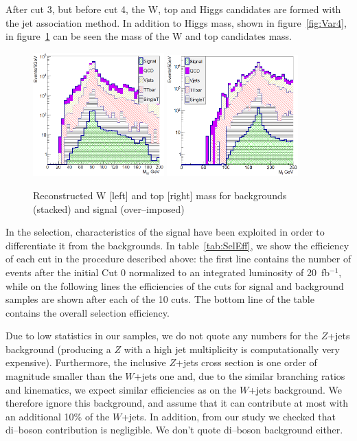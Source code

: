 After cut 3, but before cut 4, the W, top and Higgs candidates are formed with the jet association method. In addition to Higgs mass, shown in figure~\ref{fig:Var4}, in figure~\ref{fig:MWMTop} can be seen the mass of the W and top candidates mass.

\begin{figure}[!Hhtbp]
  \begin{center}
    \includegraphics[width=0.45\textwidth]{figs/Pheno/MW.png}
    \includegraphics[width=0.45\textwidth]{figs/Pheno/Mtop.png}
    \caption{Reconstructed W [left] and top [right] mass for backgrounds (stacked) and signal (over--imposed)}
    \label{fig:MWMTop}
  \end{center}
\end{figure}

In the selection, characteristics of the signal have been exploited in order to differentiate it from the backgrounds. In table~\ref{tab:SelEff}, we show the efficiency of each cut in the procedure described above: the first line contains the number of events after the initial Cut 0 normalized to an integrated luminosity of 20~fb$^{-1}$, while on the following lines the efficiencies of the cuts for signal and background samples are shown after each of the 10 cuts. The bottom line of the table contains the overall selection efficiency. 

Due to low statistics in our samples, we do not quote any numbers for the $Z$+jets background (producing a $Z$ with a high jet multiplicity is computationally very expensive). Furthermore, the inclusive $Z$+jets cross section is one order of magnitude smaller than the $W$+jets one and, due to the similar branching ratios and kinematics, we expect similar efficiencies as on the $W$+jets background. We therefore ignore this background, and assume that it can contribute at most with an additional 10\% of the $W$+jets. In addition, from our study we checked that di--boson contribution is negligible. We don't quote di--boson background either.

